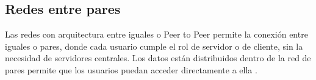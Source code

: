 \subsection{Redes entre pares}
Las redes  con arquitectura entre iguales o Peer to Peer permite la conexión entre iguales o pares, donde cada usuario cumple el rol de servidor o de cliente, sin la necesidad de servidores centrales. 
Los datos están distribuidos dentro de la red de pares permite que los usuarios puedan acceder directamente a ella \cite[]{schollmeier_definition_2002}. 